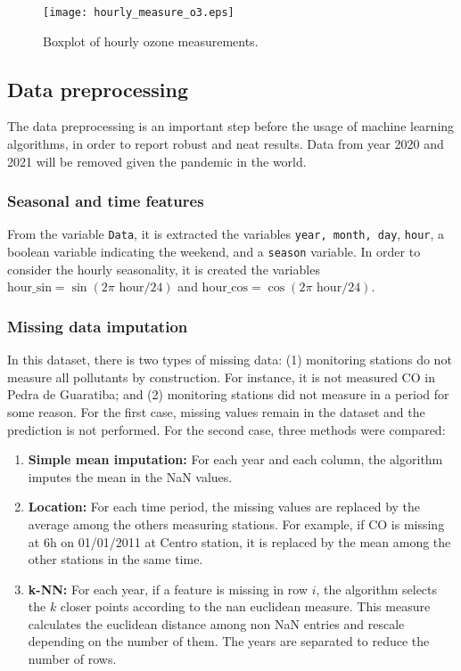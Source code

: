 \begin{figure}[H]
    \begin{center}
        \texttt{[image: hourly\_measure\_o3.eps]}
    \end{center}
    \vspace{-0.8cm}
    \caption{Boxplot of hourly ozone measurements. }
    \label{fig:hourly-boxplot-ozone}
\end{figure}


\subsection{Data preprocessing}
\label{sec:data-preprocessing}

The data preprocessing is an important step before the usage of machine
learning algorithms, in order to report robust and neat results. Data from
year 2020 and 2021 will be removed given the pandemic in the world. 

\subsubsection{Seasonal and time features}

From the variable {\tt Data}, it is extracted the variables {\tt year, month,
day}, {\tt hour}, a boolean variable indicating the weekend, and a {\tt season} variable. In
order to consider the hourly seasonality, it is created the variables
$\text{hour\_sin} = \sin(2\pi \text{ hour}/24)$ and $\text{hour\_cos} =
\cos(2\pi \text{ hour}/24)$. 

\subsubsection{Missing data imputation}

In this dataset, there is two types of missing data: (1) monitoring stations
do not measure all pollutants by construction. For instance, it is not
measured CO in Pedra de Guaratiba; and (2) monitoring stations did not
measure in a period for some reason. For the first case, missing values remain
in the dataset and the prediction is not performed. For the second case, three
methods were compared:  

\begin{enumerate}
    \item {\bf Simple mean imputation:} For each year and each column, the
    algorithm imputes the mean in the NaN values. 
    \item {\bf Location:} For each time period, the missing values are
    replaced by the average among the others measuring stations. For example, if
    CO is missing at 6h on 01/01/2011 at Centro station, it is replaced by the
    mean among the other stations in the same time. 
    \item {\bf k-NN:} For each year, if a feature is missing in row $i$, the
    algorithm selects the $k$ closer points according to the nan euclidean
    measure. This measure calculates the euclidean distance among non NaN
    entries and rescale depending on the number of them. The years are
    separated to reduce the number of rows.
\end{enumerate}

